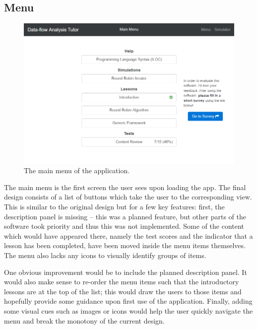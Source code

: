 \documentclass[bsc,twoside,singlespacing,parskip,logo,notimes,normalheadings]{infthesis}
\begin{document}
        \subsection{Menu}

        \begin{figure}[!ht]
          \centering
          \includegraphics[width=\textwidth, trim=0 0 0 0]{img/menu.png}
          \captionsetup{width=\textwidth, justification=centering}
          \caption{The main menu of the application.}\label{fig:menus}
        \end{figure}

        The main menu is the first screen the user sees upon loading
        the app. The final design consists of a list of buttons which
        take the user to the corresponding view. This is similar to
        the original design but for a few key features: first, the
        description panel is missing -- this was a planned feature,
        but other parts of the software took priority and thus this
        was not implemented. Some of the content which would have
        appeared there, namely the test scores and the indicator that
        a lesson has been completed, have been moved inside the menu
        items themselves. The menu also lacks any icons to visually
        identify groups of items.

        One obvious improvement would be to include the planned
        description panel. It would also make sense to re-order the
        menu items such that the introductory lessons are at the top
        of the list; this would draw the users to those items and
        hopefully provide some guidance upon first use of the
        application. Finally, adding some visual cues such as images
        or icons would help the user quickly navigate the menu and
        break the monotony of the current design.
\end{document}
